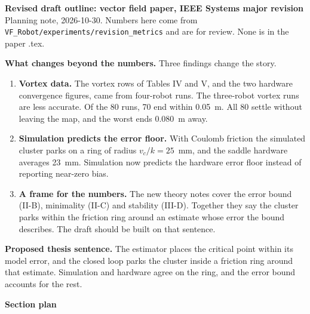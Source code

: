\documentclass[10pt]{article}
\begin{document}
\sloppy

{\large\textbf{Revised draft outline: vector field paper, IEEE Systems major revision}}\\
\small Planning note, 2026-10-30. Numbers here come from \texttt{VF\_Robot/experiments/revision\_metrics} and are for review. None is in the paper .tex.\normalsize

\medskip
\textbf{What changes beyond the numbers.} Three findings change the story.
\begin{enumerate}
\item \textbf{Vortex data.} The vortex rows of Tables IV and V, and the two hardware convergence figures, came from four-robot runs. The three-robot vortex runs are less accurate. Of the 80 runs, 70 end within 0.05~m. All 80 settle without leaving the map, and the worst ends 0.080~m away.
\item \textbf{Simulation predicts the error floor.} With Coulomb friction the simulated cluster parks on a ring of radius $v_c/k = 25$~mm, and the saddle hardware averages 23~mm. Simulation now predicts the hardware error floor instead of reporting near-zero bias.
\item \textbf{A frame for the numbers.} The new theory notes cover the error bound (II-B), minimality (II-C) and stability (III-D). Together they say the cluster parks within the friction ring around an estimate whose error the bound describes. The draft should be built on that sentence.
\end{enumerate}

\textbf{Proposed thesis sentence.} The estimator places the critical point within its model error, and the closed loop parks the cluster inside a friction ring around that estimate. Simulation and hardware agree on the ring, and the error bound accounts for the rest.

\medskip
\textbf{Section plan}
\end{document}
